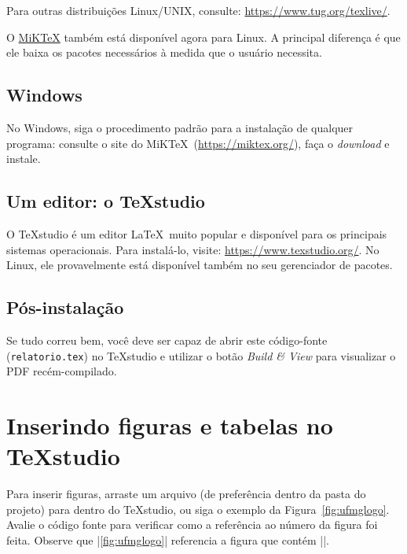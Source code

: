 \documentclass[12pt,oneside,a4paper,english,brazil]{abntex2}
\begin{document}
                Para outras distribuições Linux/UNIX, consulte: \url{https://www.tug.org/texlive/}.

                O \href{https://miktex.org/}{MiK\TeX} também está disponível agora para Linux. A principal diferença é que ele baixa os pacotes necessários à medida que o usuário necessita.
                
            \subsection{Windows}
                
                No Windows, siga o procedimento padrão para a instalação de qualquer programa: consulte o site do MiK\TeX\ (\url{https://miktex.org/}), faça o \emph{download} e instale.
                
            \subsection{Um editor: o \TeX studio}
            
                O \TeX studio é um editor \LaTeX\ muito popular e disponível para os principais sistemas operacionais. Para instalá-lo, visite: \url{https://www.texstudio.org/}. No Linux, ele provavelmente está disponível também no seu gerenciador de pacotes.
                
            \subsection{Pós-instalação}
            
                Se tudo correu bem, você deve ser capaz de abrir este código-fonte (\texttt{relatorio.tex}) no \TeX studio e utilizar o botão \emph{Build \& View} para visualizar o PDF recém-compilado.
      
      
      \section{Inserindo figuras e tabelas no \TeX studio}
     
          Para inserir figuras, arraste um arquivo (de preferência dentro da pasta do projeto) para dentro do \TeX studio, ou siga o exemplo da Figura~\ref{fig:ufmglogo}. Avalie o código fonte para verificar como a referência ao número da figura foi feita. Observe que \ltx|\ref{fig:ufmglogo}| referencia a figura que contém \ltx|\label{fig:ufmglogo}|.
          
\end{document}
